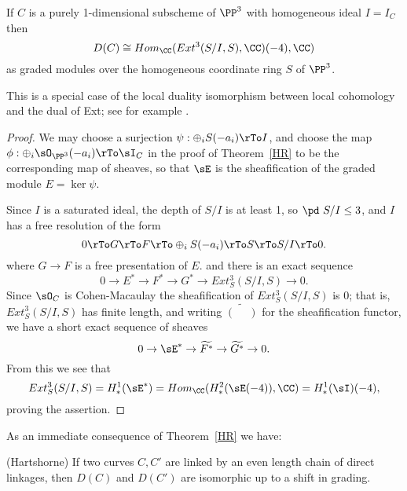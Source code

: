 \begin{corollary}
If $C$ is a purely 1-dimensional subscheme of $\PP^3$ with homogeneous ideal $I = I_C$ then 
$$
D(C) \cong Hom_\CC (Ext^3(S/I, S), \CC)(-4), \CC)
$$
as graded modules over the homogeneous coordinate ring $S$ of $\PP^3$.
\end{corollary}

This is a special case of the local duality isomorphism between local cohomology and the dual of Ext; see for example \cite[Theorem A.1.9]{MR2103875}.
\begin{proof}
We may choose a surjection  $\psi:  \oplus_iS(-a_i)\rTo I$, and choose the map
$\phi: \oplus_i\sO_{\PP^3}(-a_i)\rTo\sI_C$
in the proof of Theorem~\ref{HR}
to be the corresponding map of sheaves, so that
$\sE$ is the sheafification of the graded module $E = \ker \psi$.

Since $I$ is a saturated ideal,
 the depth of $S/I$ is at least 1, so $\pd\ S/I\leq 3$, and $I$ has a free resolution of the form
$$
0\rTo G \rTo F \rTo \oplus_iS(-a_i)  \rTo S\rTo S/I \rTo 0.
$$
where $G\to F$ is a free presentation of $E$. and there is an exact sequence
$$
0 \to E^* \to F^* \to G^* \to Ext^3_S(S/I, S) \to 0.
$$
Since $\sO_C$ is Cohen-Macaulay the sheafification of $Ext^3_S(S/I, S)$ is 0; that is,
$Ext^3_S(S/I, S)$ has finite length, and writing $\widetilde{(\phantom{-})}$ for the sheafification functor,
we have a short exact sequence of sheaves 
$$
0\to \sE^* \to \widetilde{F^*} \to \widetilde{G^*}\to 0.
$$
From this we see that 
$$
Ext^3_S(S/I,S) = H^1_*(\sE^*) = Hom_\CC( H^2_*(\sE(-4)),\CC) = H^1_*(\sI)(-4),
$$
proving the assertion.
\end{proof}

As an immediate consequence of Theorem~\ref{HR} we have:
\begin{corollary}(Hartshorne)
 If two curves $C,C'$ are linked by an even length chain of direct linkages, then 
 $D(C)$ and $D(C')$ are isomorphic up to a shift in grading.
\end{corollary}

